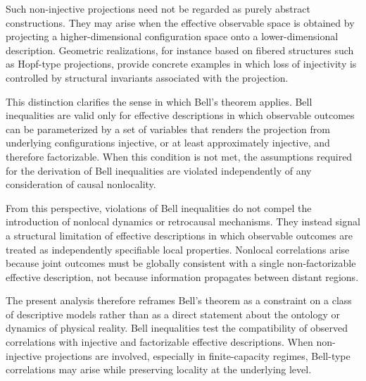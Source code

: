   Such non-injective projections need not be regarded as purely abstract constructions.
  They may arise when the effective observable space is obtained by projecting a
  higher-dimensional configuration space onto a lower-dimensional description.
  Geometric realizations, for instance based on fibered structures such as Hopf-type
  projections, provide concrete examples in which loss of injectivity is controlled
  by structural invariants associated with the projection.

  This distinction clarifies the sense in which Bell’s theorem applies.
  Bell inequalities are valid only for effective descriptions in which observable
  outcomes can be parameterized by a set of variables that renders the projection from
  underlying configurations injective, or at least approximately injective, and
  therefore factorizable.
  When this condition is not met, the assumptions required for the derivation of Bell
  inequalities are violated independently of any consideration of causal nonlocality.

  From this perspective, violations of Bell inequalities do not compel the introduction
  of nonlocal dynamics or retrocausal mechanisms.
  They instead signal a structural limitation of effective descriptions in which
  observable outcomes are treated as independently specifiable local properties.
  Nonlocal correlations arise because joint outcomes must be globally consistent with a
  single non-factorizable effective description, not because information propagates
  between distant regions.

  The present analysis therefore reframes Bell’s theorem as a constraint on a class of
  descriptive models rather than as a direct statement about the ontology or dynamics of physical reality.
  Bell inequalities test the compatibility of observed correlations with injective and
  factorizable effective descriptions.
  When non-injective projections are involved, especially in finite-capacity regimes,
  Bell-type correlations may arise while preserving locality at the underlying level.

